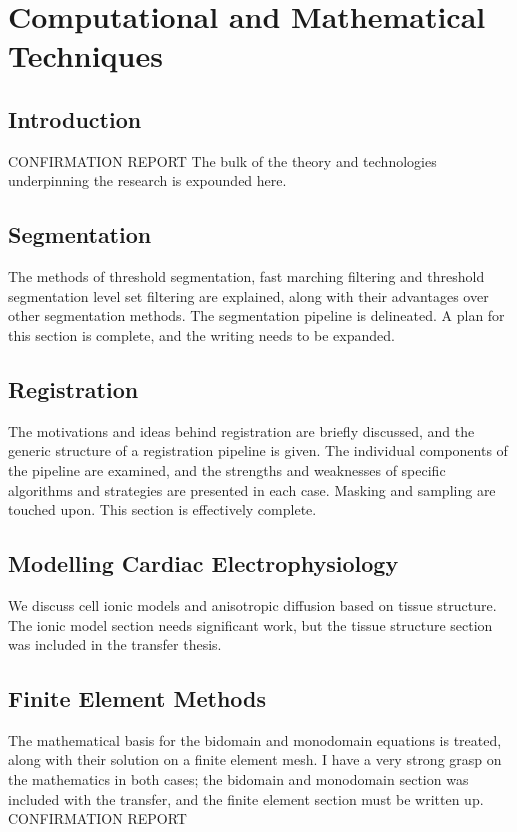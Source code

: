 \chapter{Computational and Mathematical Techniques}
\dblspace
\begin{quote}{\em }\end{quote}

\section{Introduction}
\label{sec:review:introduction}
CONFIRMATION REPORT
The bulk of the theory and technologies underpinning the research is expounded here.
\section{Segmentation}
  The methods of threshold segmentation, fast marching filtering and threshold segmentation level set filtering are explained, along with their advantages over other segmentation methods. The segmentation pipeline is delineated. A plan for this section is complete, and the writing needs to be expanded.
\section{Registration}
  The motivations and ideas behind registration are briefly discussed, and the generic structure of a registration pipeline is given. The individual components of the pipeline are examined, and the strengths and weaknesses of specific algorithms and strategies are presented in each case. Masking and sampling are touched upon. This section is effectively complete.
\section{Modelling Cardiac Electrophysiology}
We discuss cell ionic models and anisotropic diffusion based on tissue structure. The ionic model section needs significant work, but the tissue structure section was included in the transfer thesis.
\section{Finite Element Methods}
  The mathematical basis for the bidomain and monodomain equations is treated, along with their solution on a finite element mesh. I have a very strong grasp on the mathematics in both cases; the bidomain and monodomain section was included with the transfer, and the finite element section must be written up.
CONFIRMATION REPORT


